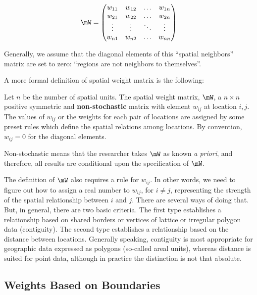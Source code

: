 \documentclass[english,12pt]{book}\usepackage[]{graphicx}\usepackage[]{xcolor}
\begin{document}
\begin{equation*}
\mW = \begin{pmatrix}
        w_{11} & w_{12} & \hdots & w_{1n} \\ 
        w_{21} & w_{22} & \hdots & w_{2n} \\
        \vdots & \vdots & \ddots & \vdots \\
        w_{n1} & w_{n2} & \hdots & w_{nn} 
      \end{pmatrix}
\end{equation*}

Generally, we assume that the diagonal elements of this ``spatial neighbors'' matrix are set to zero: ``regions are not neighbors to themselves''.

A more formal definition of spatial weight matrix is the following:

\begin{definition}\label{def:W}
  Let $n$ be the number of spatial units. The spatial weight matrix, $\mW$, a $n\times n$ positive symmetric and \textbf{non-stochastic} matrix with element $w_{ij}$ at location $i,j$. The values of $w_{ij}$ or the weights for each pair of locations are assigned by some preset rules which define the spatial relations among locations. By convention, $w_{ij} = 0$ for the diagonal elements.
\end{definition}

Non-stochastic means that the researcher takes $\mW$ as known \emph{a priori}, and therefore, all results are conditional upon the specification of $\mW$.

The definition of $\mW$ also requires a rule for $w_{ij}$. In other words, we need to figure out how to assign a real number to $w_{ij}$, for $i\neq j$, representing the strength of the spatial relationship between $i$ and $j$. There are several ways of doing that. But, in general, there are two basic criteria. The first type establishes a relationship based on shared borders or vertices of lattice or irregular polygon data (contiguity). The second type establishes a relationship based on the distance between locations. Generally speaking, contiguity is most appropriate for geographic data expressed as polygons (so-called areal units), whereas distance is suited for point data, although in practice the distinction is not that absolute. 

\subsection{Weights Based on Boundaries}
\end{document}
